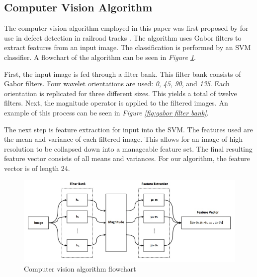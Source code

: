 \documentclass[letterpaper, 10 pt, conference]{ieeeconf}  %
\begin{document}
\subsection{Computer Vision Algorithm}

The computer vision algorithm employed in this paper was first proposed by for use in defect detection in railroad tracks \cite{steelDefect}. The algorithm uses Gabor filters to extract features from an input image. The classification is performed by an SVM classifier. A flowchart of the algorithm can be seen in \textit{Figure \ref{fig:vision algorithm diagram}}.

First, the input image is fed through a filter bank. This filter bank consists of Gabor filters. Four wavelet orientations are used: \textit{0\degree}, \textit{45\degree}, \textit{90\degree}, and \textit{135\degree}. Each orientation is replicated for three different sizes. This yields a total of twelve filters. Next, the magnitude operator is applied to the filtered images. An example of this process can be seen in \textit{Figure \ref{fig:gabor filter bank}}.

The next step is feature extraction for input into the SVM. The features used are the mean and variance of each filtered image. This allows for an image of high resolution to be collapsed down into a manageable feature set. The final resulting feature vector consists of all means and variances. For our algorithm, the feature vector is of length 24.

\begin{figure}
    \centering
    \includegraphics[width=.75\textwidth]{computer_vision_diagram.png}
    \caption{Computer vision algorithm flowchart}
    \vspace*{2mm}
    \label{fig:vision algorithm diagram}
\end{figure}
\end{document}
